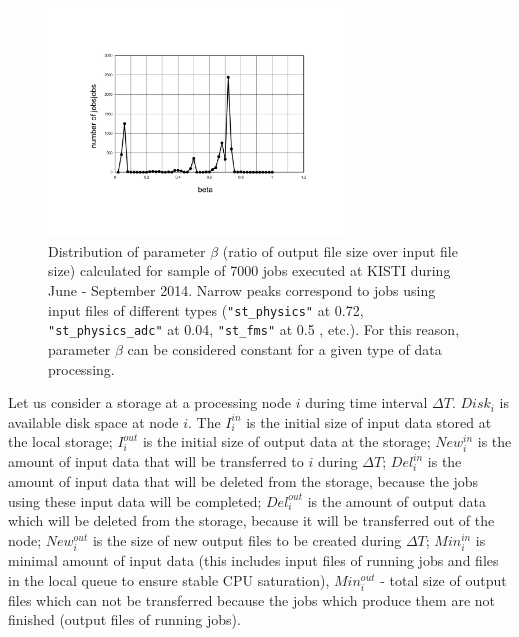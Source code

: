 \documentclass[english]{ddny}
\begin{document}
\begin{figure}[h]
	\begin{center}
		\includegraphics [trim= 20mm 30mm 10mm 30mm , clip, width=0.7\textwidth]{pic/beta.pdf}
	\end{center}
	\caption{Distribution of parameter $\beta$ (ratio of output file size over input file size) calculated for sample of 7000 jobs executed at KISTI during June - September 2014. Narrow peaks correspond to jobs using input files of different types (\texttt{"st\_physics"} at 0.72, \texttt{"st\_physics\_adc"} at 0.04, \texttt{"st\_fms"} at 0.5 , etc.). For this reason, parameter $\beta$ can be considered constant for a given type of data processing.}
	\label{beta-distr}
\end{figure} 

Let us consider a storage at a processing node $i$ during time interval $\Delta T$. 
$Disk_{i}$ is available disk space at node $i$.
The $I_{i}^{in}$ is the initial size of input data stored at the local storage;
$I_{i}^{out}$ is the initial size of output data at the storage; 
$New_{i}^{in}$ is the amount of input data that will be transferred to $i$ during $\Delta T$; 
$Del_{i}^{in}$ is the amount of input data that will be deleted from the storage, because the jobs using these input data will be completed; 
$Del_{i}^{out}$ is the amount of output data which will be deleted from the storage, because it will be transferred out of the node; 
$New_{i}^{out}$ is the size of new output files to be created during $\Delta T$;
$Min_{i}^{in}$ is minimal amount of input data (this includes input files of running jobs and files in the local queue to ensure stable CPU saturation), 
$Min_{i}^{out}$ - total size of output files which can not be transferred because the jobs which produce them are not finished (output files of running jobs). 
\end{document}
